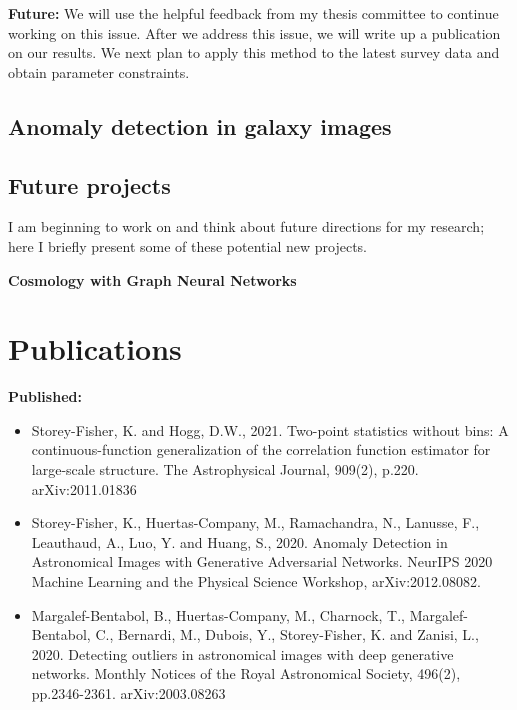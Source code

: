 \documentclass{article}
\begin{document}
\textbf{Future:}
We will use the helpful feedback from my thesis committee to continue working on this issue.
After we address this issue, we will write up a publication on our results.
We next plan to apply this method to the latest survey data and obtain parameter constraints.

\subsection{Anomaly detection in galaxy images}

\subsection{Future projects}

I am beginning to work on and think about future directions for my research; here I briefly present some of these potential new projects.

\textbf{Cosmology with Graph Neural Networks}

\section{Publications}

\textbf{Published:}
\begin{itemize}
\item Storey-Fisher, K. and Hogg, D.W., 2021. Two-point statistics without bins: A continuous-function generalization of the correlation function estimator for large-scale structure. The Astrophysical Journal, 909(2), p.220. arXiv:2011.01836
\item Storey-Fisher, K., Huertas-Company, M., Ramachandra, N., Lanusse, F., Leauthaud, A., Luo, Y. and Huang, S., 2020. Anomaly Detection in Astronomical Images with Generative Adversarial Networks. NeurIPS 2020 Machine Learning and the Physical Science Workshop, arXiv:2012.08082.
\item Margalef-Bentabol, B., Huertas-Company, M., Charnock, T., Margalef-Bentabol, C., Bernardi, M., Dubois, Y., Storey-Fisher, K. and Zanisi, L., 2020. Detecting outliers in astronomical images with deep generative networks. Monthly Notices of the Royal Astronomical Society, 496(2), pp.2346-2361. arXiv:2003.08263
\end{itemize}
\end{document}

